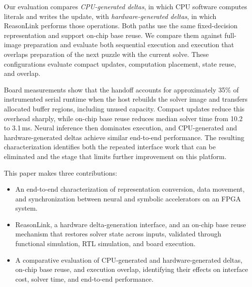 Our evaluation compares \emph{CPU-generated deltas}, in which CPU software computes literals and writes the update, with \emph{hardware-generated deltas}, in which ReasonLink performs those operations. Both paths use the same fixed-decision representation and support on-chip base reuse. We compare them against full-image preparation and evaluate both sequential execution and execution that overlaps preparation of the next puzzle with the current solve. These configurations evaluate compact updates, computation placement, state reuse, and overlap.

Board measurements show that the handoff accounts for approximately 35\% of instrumented serial runtime when the host rebuilds the solver image and transfers allocated buffer regions, including unused capacity. Compact updates reduce this overhead sharply, while on-chip base reuse reduces median solver time from 10.2 to 3.1\,ms. Neural inference then dominates execution, and CPU-generated and hardware-generated deltas achieve similar end-to-end performance. The resulting characterization identifies both the repeated interface work that can be eliminated and the stage that limits further improvement on this platform.

This paper makes three contributions:
\begin{itemize}
\item An end-to-end characterization of representation conversion, data movement, and synchronization between neural and symbolic accelerators on an FPGA system.
\item ReasonLink, a hardware delta-generation interface, and an on-chip base reuse mechanism that restores solver state across inputs, validated through functional simulation, RTL simulation, and board execution.
\item A comparative evaluation of CPU-generated and hardware-generated deltas, on-chip base reuse, and execution overlap, identifying their effects on interface cost, solver time, and end-to-end performance.
\end{itemize}

